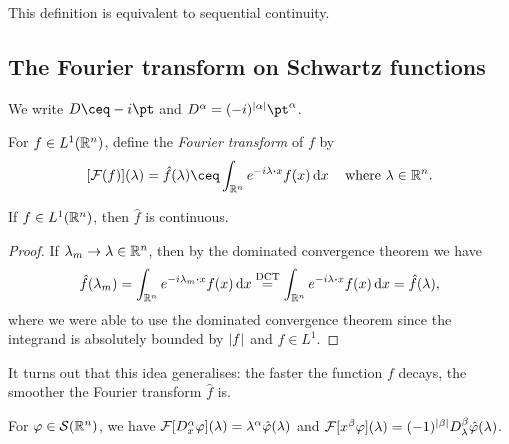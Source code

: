 This definition is equivalent to sequential continuity. 

\subsection{The Fourier transform on Schwartz functions}

\begin{convention}
	We write $D \ceq -i\pt$ and $D^\alpha = (-i)^{\abs{\alpha}} \pt^\alpha$. 
\end{convention}

\begin{definition}
	For $f \in L^1(\mathbb R^n)$, define the \emph{Fourier transform} of $f$ by  
	\[
	[\FF(f)](\lambda) = \hat f(\lambda) \ceq \int_{\RR^n} e^{-i\lambda \vdot x} f(x) \dd{x} \quad\text{where $\lambda \in \RR^n$}. 
	\]
\end{definition}

\begin{lemma}
	If $f \in L^1(\mathbb R^n)$, then $\hat f$ is continuous. 
\end{lemma}

\begin{proof}
	If $\lambda_m \to \lambda \in \mathbb R^n$, then by the dominated convergence theorem we have
	\[
	\hat f(\lambda_m) = \int_{\RR^n} e^{-i\lambda_m \vdot x} f(x) \dd{x} \overset{\text{DCT}}= \int_{\RR^n} e^{-i\lambda \vdot x} f(x) \dd{x} = \hat f(\lambda),
	\]
	where we were able to use the dominated convergence theorem since the integrand is absolutely bounded by $\abs{f}$ and $f \in L^1$. 
\end{proof}

It turns out that this idea generalises: the faster the function $f$ decays, the smoother the Fourier transform $\hat f$ is.  

\begin{lemma} \label{lem:differentiate_fourier}
	For $\varphi \in \mathcal S(\mathbb R^n)$, we have $\mathcal F[D_x^\alpha \varphi](\lambda) = \lambda^\alpha \hat{\varphi}(\lambda)$ and $\mathcal F[x^\beta\varphi](\lambda) = (-1)^{\abs{\beta}} D_\lambda^\beta \hat{\varphi}(\lambda)$. 
\end{lemma}

